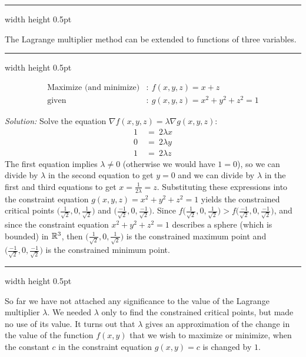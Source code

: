\hrule width \textwidth height 0.5pt
\vspace{3mm}

The Lagrange multiplier method can be extended to functions of three variables.

\vspace{3mm}
\hrule width \textwidth height 0.5pt
\begin{exmp}
 \begin{align*}
  \text{Maximize (and minimize)}&: ~ f(x,y,z) = x+z\\
  \text{given}&: ~ g(x,y,z) = x^2 + y^2 + z^2 = 1
 \end{align*}
 \par\noindent \emph{Solution:} Solve the equation $\nabla f(x,y,z) = \lambda \nabla g(x,y,z)$:
 \begin{align*}
  1 ~&=~ 2\lambda x\\
  0 ~&=~ 2\lambda y\\
  1 ~&=~ 2\lambda z
 \end{align*}
 The first equation implies $\lambda \ne 0$ (otherwise we would have $1=0$), so we can divide by $\lambda$ in the
 second equation to get $y=0$ and we can divide by $\lambda$ in the first and third equations to get
 $x=\frac{1}{2\lambda}=z$. Substituting these expressions into the constraint equation $g(x,y,z) = x^2 + y^2 + z^2 = 1$
 yields the constrained critical points $\biggl( \frac{1}{\sqrt{2}},0,\frac{1}{\sqrt{2}} \biggr)$ and
 $\biggl( \frac{-1}{\sqrt{2}},0,\frac{-1}{\sqrt{2}} \biggr)$. Since $f\biggl( \frac{1}{\sqrt{2}},0,\frac{1}{\sqrt{2}}
 \biggr) > f\biggl( \frac{-1}{\sqrt{2}},0,\frac{-1}{\sqrt{2}} \biggr)$, and since the constraint equation
 $x^2 + y^2 + z^2 = 1$ describes a sphere (which is bounded) in $\mathbb{R}^{3}$, then
 $\biggl( \frac{1}{\sqrt{2}},0,\frac{1}{\sqrt{2}} \biggr)$ is the constrained maximum point and
 $\biggl( \frac{-1}{\sqrt{2}},0,\frac{-1}{\sqrt{2}} \biggr)$ is the constrained minimum point.
\end{exmp}
\hrule width \textwidth height 0.5pt
\vspace{3mm}

So far we have not attached any significance to the value of the Lagrange multiplier $\lambda$. We needed
$\lambda$ only to find the constrained critical points, but made no use of its value. It turns out that $\lambda$
gives an approximation of the change in the value of the function $f(x,y)$ that we wish to maximize or minimize, when
the constant $c$ in the constraint equation $g(x,y)=c$ is changed by $1$.

